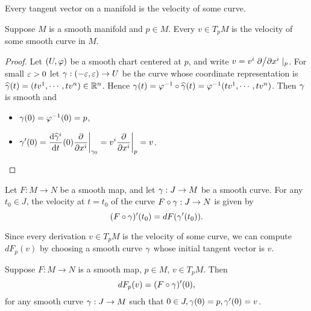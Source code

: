Every tangent vector on a manifold is the velocity of some curve.
\begin{proposition}
    Suppose $M$ is a smooth manifold and $p \in M$. Every $v \in T_pM$ is the velocity of some smooth curve in $M$. 
\end{proposition}
\begin{proof}
    Let $(U,\varphi)$ be a smooth chart centered at $p$, and write $v = v^i \pdv*{}{x^i}|_p$. For small $\varepsilon > 0$ let $\gamma:(-\varepsilon,\varepsilon) \to U$ be the curve whose coordinate representation is $\widehat{\gamma}(t) = (tv^1, \cdots, tv^n) \in \mathbb{R}^n$. Hence $\gamma(t) = \varphi^{-1} \circ \widehat{\gamma} (t) = \varphi^{-1}(tv^1, \cdots, tv^n)$. Then $\gamma$ is smooth and 
    \begin{itemize}
        \item $\gamma(0) = \varphi^{-1}(0) = p$, 
        \item $\displaystyle{ \gamma'(0) = {\dv{\widehat{\gamma}^i}{t}}(0) \pdv{}{x^i}\bigg|_{\gamma_0} = v^i \pdv{}{x^i}\bigg|_{p} = v}$.    
    \end{itemize}
\end{proof}
\begin{proposition}
    Let $F:M \to N$ be a smooth map, and let $\gamma:J \to M$ be a smooth curve. For any $t_0 \in J$, the velocity at $t=t_0$ of the curve $F \circ \gamma:J \to N$ is given by $$(F \circ \gamma)'(t_0) = dF(\gamma'(t_0)). $$
\end{proposition}
Since every derivation $v \in T_p M$ is the velocity of some curve, we can compute $dF_p(v)$ by choosing a smooth curve $\gamma$ whose initial tangent vector is $v$.
\begin{proposition}
    Suppose $F:M \to N$ is a smooth map, $p \in M$, $v \in T_pM$. Then 
    $$ dF_p(v) = (F \circ \gamma)'(0), $$
    for any smooth curve $\gamma:J \to M$ such that $0 \in J, \gamma(0) = p, \gamma'(0) = v$. 
\end{proposition}